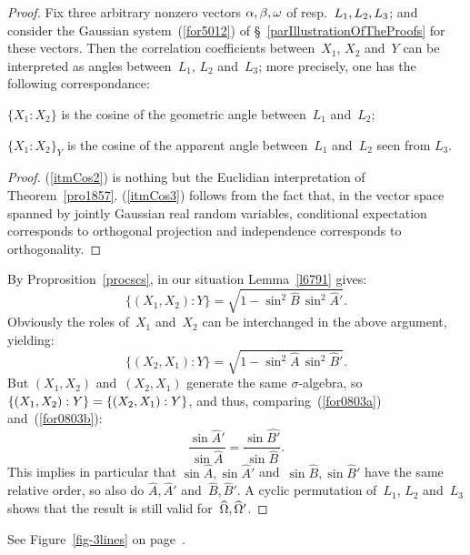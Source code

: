 \begin{proof}
Fix three arbitrary nonzero vectors $\alpha, \allowbreak \beta, \allowbreak \omega$ of resp.~$L_1, \allowbreak L_2, \allowbreak L_3$;
and consider the Gaussian system~(\ref{for5012}) of \S~\ref{parIllustrationOfTheProofs}
for these vectors.
Then the correlation coefficients between~$X_1$, $X_2$ and~$Y$
can be interpreted as angles between~$L_1$, $L_2$ and~$L_3$;
more precisely, one has the following correspondance:
%
\begin{Pro}\label{procscs}\strut
\begin{ienumerate}
\item\label{itmCos2}
$\{X_1:X_2\}$ is the cosine of the geometric angle between~$L_1$ and~$L_2$;
\item\label{itmCos3}
$\{X_1:X_2\}_Y$ is the cosine of the apparent angle between~$L_1$ and~$L_2$ seen from $L_3$.
\end{ienumerate}
\end{Pro}
%
\begin{proof}
(\ref{itmCos2}) is nothing but the Euclidian interpretation of Theorem~\ref{pro1857}.
(\ref{itmCos3}) follows from the fact that,
in the vector space spanned by jointly Gaussian real random variables,
conditional expectation corresponds to orthogonal projection
and independence corresponds to orthogonality.
\end{proof}

By Proprosition~\ref{procscs}, in our situation Lemma~\ref{l6791} gives:
\[\label{for0803a} \big\{(X_1,X_2):Y\big\} = \sqrt{1 - \sin^2\widehat{B} \, \sin^2\widehat{A}'} .\]
%
Obviously the roles of~$X_1$ and~$X_2$ can be interchanged in the above argument,
yielding:
\[\label{for0803b} \big\{(X_2,X_1):Y\big\} = \sqrt{1 - \sin^2\widehat{A} \, \sin^2\widehat{B}'} .\]
But $(X_1,X_2)$ and~$(X_2,X_1)$ generate the same $\sigma$-algebra,
so ${\{(X_1,X_2):Y\}} \allowbreak = {\{(X_2,X_1):Y\}}$,
and thus, comparing~(\ref{for0803a}) and~(\ref{for0803b}):
\[ \frac{\sin\widehat{A}'}{\sin\widehat{A}} = \frac{\sin\widehat{B'}}{\sin\widehat{B}} .\]
This implies in particular that
$\sin\widehat{A},\sin\widehat{A}'$ and~$\sin\widehat{B},\sin\widehat{B}'$
have the same relative order, so also do $\widehat{A},\widehat{A}'$ and~$\widehat{B},\widehat{B}'$.
A cyclic permutation of~$L_1$, $L_2$ and~$L_3$
shows that the result is still valid for~$\widehat{\Omega},\allowbreak \widehat{\Omega}'$.\linebreak[1]\strut
\end{proof}

\begin{Xpl}
See Figure~\ref{fig-3lines} on page~\pageref{fig-3lines}.
\end{Xpl}

